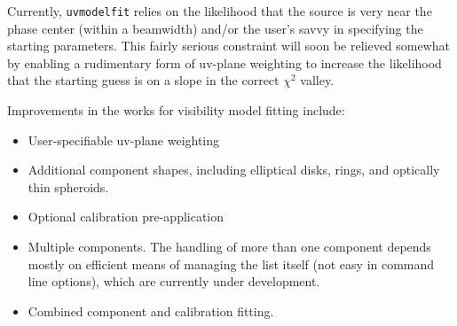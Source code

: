 Currently, {\tt uvmodelfit} relies on the likelihood that the source
is very near the phase center (within a beamwidth) and/or the user's
savvy in specifying the starting parameters.  This fairly serious
constraint will soon be relieved somewhat by enabling a rudimentary
form of uv-plane weighting to increase the likelihood that the
starting guess is on a slope in the correct $\chi^2$ valley.

Improvements in the works for visibility model fitting include:

\begin{itemize}
   \item User-specifiable uv-plane weighting
   \item Additional component shapes, including elliptical disks, rings,
         and optically thin spheroids.
   \item Optional calibration pre-application
   \item Multiple components.  The handling of more than one component
         depends mostly on efficient means of managing the list itself (not easy in
         command line options), which are currently under development.
   \item Combined component and calibration fitting.
\end{itemize}

